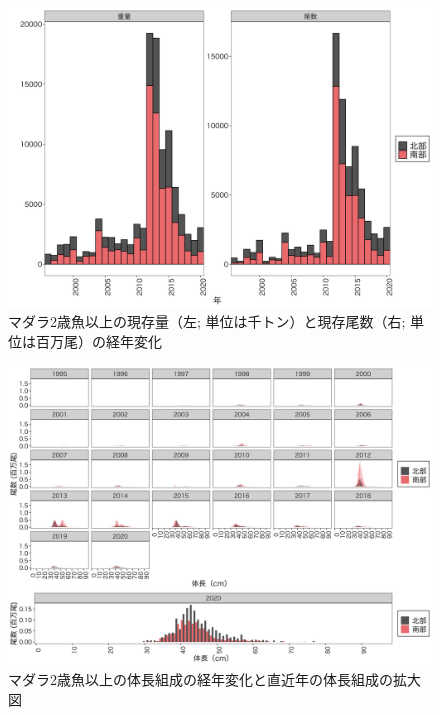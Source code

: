 \documentclass[11pt]{article} %
\begin{document}
\begin{linenumbers}
\begin{figure}[h]
  \centering
  \includegraphics[width = 14cm]{マダラ２＋trend.png}
  \caption{マダラ2歳魚以上の現存量（左; 単位は千トン）と現存尾数（右; 単位は百万尾）の経年変化}
\end{figure}

\begin{figure}[h]
  \centering
  \includegraphics[width = 14cm]{マダラ2+length.png}
  \caption{マダラ2歳魚以上の体長組成の経年変化と直近年の体長組成の拡大図}
\end{figure}


\end{linenumbers}
\end{document}
